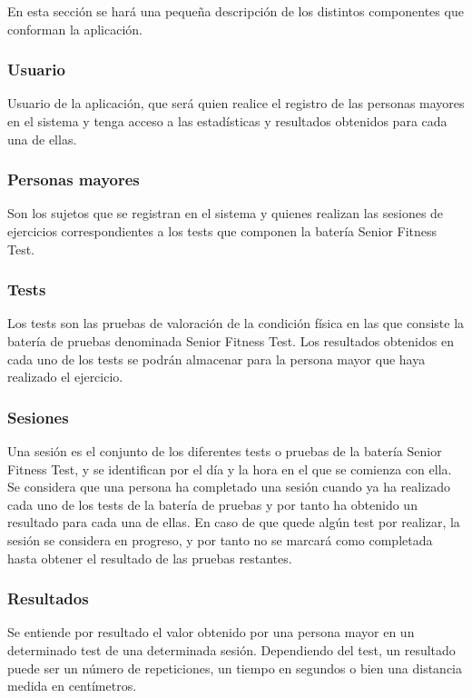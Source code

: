 En esta sección se hará una pequeña descripción de los distintos componentes que conforman la aplicación.

\subsubsection{Usuario}

Usuario de la aplicación, que será quien realice el registro de las personas mayores en el sistema y tenga acceso a las estadísticas y resultados obtenidos para cada una de ellas.

\subsubsection{Personas mayores}

Son los sujetos que se registran en el sistema y quienes realizan las sesiones de ejercicios correspondientes a los tests que componen la batería Senior Fitness Test.

\subsubsection{Tests}

Los tests son las pruebas de valoración de la condición física en las que consiste la batería de pruebas denominada Senior Fitness Test. Los resultados obtenidos en cada uno de los tests se podrán almacenar para la persona mayor que haya realizado el ejercicio.

\subsubsection{Sesiones}

Una sesión es el conjunto de los diferentes tests o pruebas de la batería Senior Fitness Test, y se identifican por el día y la hora en el que se comienza con ella. Se considera que una persona ha completado una sesión cuando ya ha realizado cada uno de los tests de la batería de pruebas y por tanto ha obtenido un resultado para cada una de ellas. En caso de que quede algún test por realizar, la sesión se considera en progreso, y por tanto no se marcará como completada hasta obtener el resultado de las pruebas restantes.

\subsubsection{Resultados}

Se entiende por resultado el valor obtenido por una persona mayor en un determinado test de una determinada sesión. Dependiendo del test, un resultado puede ser un número de repeticiones, un tiempo en segundos o bien una distancia medida en centímetros.

